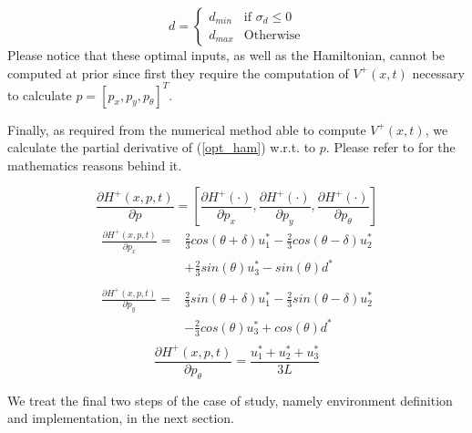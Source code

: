 \begin{equation}
  d= 
	\begin{cases} 
		d_{min} &\text{if } \sigma_{d} \leq 0\\
		d_{max} &\text{Otherwise} 
	\end{cases}
  \label{opt_d}
\end{equation}
Please notice that these optimal inputs, as well as the Hamiltonian, cannot be computed at prior since first they require the computation of $V^+(x,t)$ necessary to calculate $p = [p_x, p_y, p_{\theta}]^T$.

Finally, as required from the numerical method able to compute $V^+(x,t)$, we calculate the partial derivative of (\ref{opt_ham}) w.r.t. to $p$. Please refer to \cite{new_paper} \cite{mitch_phd} for the mathematics reasons behind it.

\begin{equation}
  \frac{\partial H^+(x,p,t)}{\partial p} = 
    \left[
      \frac{\partial H^+(\cdot)}{\partial p_x},
      \frac{\partial H^+(\cdot)}{\partial p_y},
      \frac{\partial H^+(\cdot)}{\partial p_{\theta}}    
    \right]
\end{equation}
\begin{equation*}
  \begin{split}
    \frac{\partial H^+(x,p,t)}{\partial p_x} =
    &
    \frac{2}{3}cos(\theta+\delta)u_1^* - \frac{2}{3}cos(\theta-\delta)u_2^* \\
    &
    + \frac{2}{3}sin(\theta)u_3^* - sin(\theta)d^* \\
  \end{split}
\end{equation*}
\begin{equation*}
  \begin{split}
    \frac{\partial H^+(x,p,t)}{\partial p_y} =
    &
    \frac{2}{3}sin(\theta+\delta)u_1^* - \frac{2}{3}sin(\theta-\delta)u_2^* \\
    &
    - \frac{2}{3}cos(\theta)u_3^* + cos(\theta)d^* \\
  \end{split}
\end{equation*}
\begin{equation*}
    \frac{\partial H^+(x,p,t)}{\partial p_{\theta}} = \frac{u_1^* + u_2^* + u_3^*}{3L} 
\end{equation*}

We treat the final two steps of the case of study, namely environment definition and implementation, in the next section.



